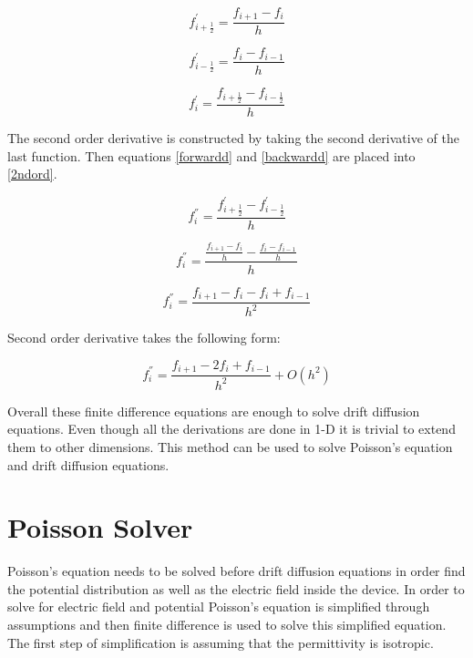 \begin{doublespace}
\begin{equation}
f_{i+\frac{1}{2}}^{'}=\frac{f_{i+1}-f_{i}}{h}
\label{forwardd}
\end{equation}

\begin{equation}
f_{i-\frac{1}{2}}^{'}=\frac{f_{i}-f_{i-1}}{h}
\label{backwardd}
\end{equation}

\begin{equation}
f^{'}_{i}=\frac{f_{i+\frac{1}{2}}-f_{i-\frac{1}{2}}}{h}
\label{2ndord}
\end{equation}

The second order derivative is constructed by taking the second derivative of the last function. Then equations \ref{forwardd} and \ref{backwardd} are placed into \ref{2ndord}.

\begin{equation}\nonumber
f^{''}_{i}=\frac{f_{i+\frac{1}{2}}^{'}-f_{i-\frac{1}{2}}^{'}}{h}
\end{equation}

\begin{equation}\nonumber
f^{''}_{i}=\frac{\frac{f_{i+1}-f_{i}}{h}-\frac{f_{i}-f_{i-1}}{h}}{h}
\end{equation}

\begin{equation}\nonumber
f^{''}_{i}=\frac{f_{i+1}-f_{i}-f_{i}+f_{i-1}}{h^2}
\end{equation}

Second order derivative takes the following form:

\begin{equation}
f^{''}_{i}=\frac{f_{i+1}-2f_{i}+f_{i-1}}{h^2}+O(h^2)
\label{fdc2}
\end{equation}

Overall these finite difference equations are enough to solve drift diffusion equations. Even though all the derivations are done in 1-D it is trivial to extend them to other dimensions. This method can be used to solve Poisson's equation and drift diffusion equations.

\clearpage

\section{Poisson Solver}

Poisson's equation needs to be solved before drift diffusion equations in order find the potential distribution as well as the electric field inside the device. In order to solve for electric field and potential Poisson's equation is simplified through assumptions and then finite difference is used to solve this simplified equation\cite{smith1985numerical}. The first step of simplification is assuming that the permittivity is isotropic.
 

\end{doublespace}
